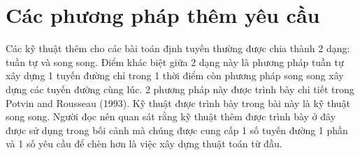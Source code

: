 \section{Các phương pháp thêm yêu cầu}
Các kỹ thuật thêm cho các bài toán định tuyến thường được chia thành 2 dạng: tuần tự và song song. Điểm khác biệt giữa 2 dạng này là phương pháp tuần tự xây dựng 1 tuyến đường chỉ trong 1 thời điểm còn phương pháp song song xây dựng các tuyến đường cùng lúc. 2 phương pháp này được trình bày chi tiết trong Potvin and Rousseau (1993). Kỹ thuật được trình bày trong bài này là kỹ thuật song song. Người đọc nên quan sát rằng kỹ thuật thêm được trình bày ở đây được sử dụng trong bối cảnh mà chúng được cung cấp 1 số tuyến đường 1 phần và 1 số yêu cầu để chèn hơn là việc xây dựng thuật toán từ đầu.